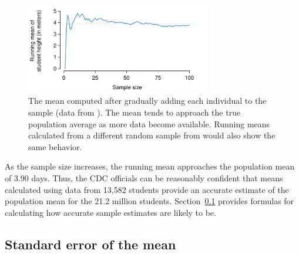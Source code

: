 \begin{spacing}{1.5}
\begin{figure}[h]
   \centering
   \includegraphics[width=0.72\textwidth]{ch_inference_foundations_oi_biostat/figures/yrbssActiveRunningMean/yrbssActiveRunningMean}
   \caption{The mean computed after gradually adding each individual to the sample (data from ). The mean tends to approach the true population average as more data become available. Running means calculated from a different random sample from  would also show the same behavior.}
   \label{yrbssActiveRunningMean}
\end{figure}

As the sample size increases, the running mean approaches the population mean of 3.90 days. Thus, the CDC officials can be reasonably confident that means calculated using data from 13,582 students provide an accurate estimate of the population mean for the 21.2 million students.  Section~\ref{seOfTheMean} provides formulas for calculating how accurate sample estimates are likely to be.

\subsection{Standard error of the mean}
\label{seOfTheMean}


\end{spacing}
